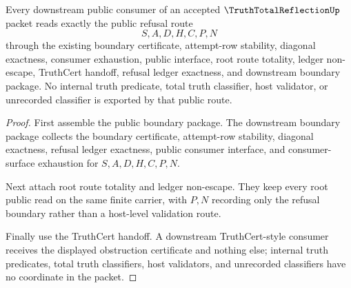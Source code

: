 \begin{theorem}
\label{thm:truth-total-reflection-root-public-readiness}
Every downstream public consumer of an accepted $\TruthTotalReflectionUp$
packet reads exactly the public refusal route
$$
S,A,D,H,C,P,N
$$
through the existing boundary certificate, attempt-row stability, diagonal
exactness, consumer exhaustion, public interface, root route totality, ledger
non-escape, TruthCert handoff, refusal ledger exactness, and downstream
boundary package. No internal truth predicate, total truth classifier, host
validator, or unrecorded classifier is exported by that public route.
\end{theorem}
\begin{proof}
First assemble the public boundary package. The downstream boundary package
collects the boundary certificate, attempt-row stability, diagonal exactness,
refusal ledger exactness, public consumer interface, and consumer-surface
exhaustion for $S,A,D,H,C,P,N$.

Next attach root route totality and ledger non-escape. They keep every root
public read on the same finite carrier, with $P,N$ recording only the refusal
boundary rather than a host-level validation route.

Finally use the TruthCert handoff. A downstream TruthCert-style consumer
receives the displayed obstruction certificate and nothing else; internal truth
predicates, total truth classifiers, host validators, and unrecorded
classifiers have no coordinate in the packet.
\end{proof}


